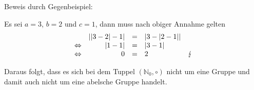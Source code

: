 \documentclass[main.tex]{subfiles}
\begin{document}
Beweis durch Gegenbeispiel:

Es sei $a=3$, $b=2$ und $c=1$, dann muss nach obiger Annahme gelten
\begin{equation*}
    \begin{array}{ c r c l c }
        & | | 3-2| -1|  & = & | 3-| 2-1| |  & \\
        \Leftrightarrow  & | 1-1|  & = & | 3-1|  & \\
        \Leftrightarrow  & 0 & = & 2 & \lightning 
    \end{array}
\end{equation*}

Daraus folgt, dass es sich bei dem Tuppel $(\mathbb{N}_{0} ,\circ )$ nicht um eine Gruppe und damit auch nicht um eine abelsche Gruppe handelt.
\end{document}
